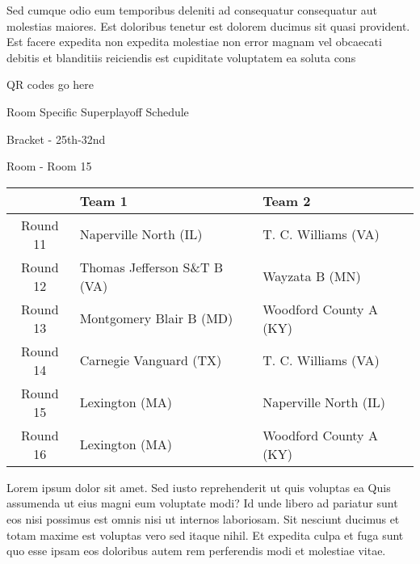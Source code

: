 \documentclass{article}%
\begin{document}
\newline%
    Sed cumque odio eum temporibus deleniti ad consequatur consequatur aut molestias maiores. Est doloribus tenetur est dolorem ducimus sit quasi provident. Est facere expedita non expedita molestiae non error magnam vel obcaecati debitis et blanditiis reiciendis est cupiditate voluptatem ea soluta cons%
\vspace*{140pt}%
\begin{center}%
\begin{Huge}%
QR codes go here%
\end{Huge}%
\end{center}%
\newpage%
\begin{center}%
\begin{Huge}%
Room Specific Superplayoff Schedule%
\end{Huge}%
\vspace*{8pt}%
\linebreak%
\begin{Large}%
Bracket {-} 25th{-}32nd%
\end{Large}%
\vspace*{8pt}%
\linebreak%
\vspace*{8pt}%
\begin{Large}%
Room {-} Room 15%
\end{Large}%
\end{center}%
%
\begin{tabularx}{\textwidth}{|c|Y|Y|}%
\hline%
&Team 1&Team 2\\%
\hline%
Round 11&Naperville North (IL)&T. C. Williams (VA)\\%
Round 12&Thomas Jefferson S\&T B (VA)&Wayzata B (MN)\\%
Round 13&Montgomery Blair B (MD)&Woodford County A (KY)\\%
Round 14&Carnegie Vanguard (TX)&T. C. Williams (VA)\\%
Round 15&Lexington (MA)&Naperville North (IL)\\%
Round 16&Lexington (MA)&Woodford County A (KY)\\%
\hline%
\end{tabularx}%
\vspace*{8pt}%
\newline%
    Lorem ipsum dolor sit amet. Sed iusto reprehenderit ut quis voluptas ea Quis assumenda ut eius magni eum voluptate modi? Id unde libero ad pariatur sunt eos nisi possimus est omnis nisi ut internos laboriosam. Sit nesciunt ducimus et totam maxime est voluptas vero sed itaque nihil. Et expedita culpa et fuga sunt quo esse ipsam eos doloribus autem rem perferendis modi et molestiae vitae.\newline%
\end{document}
